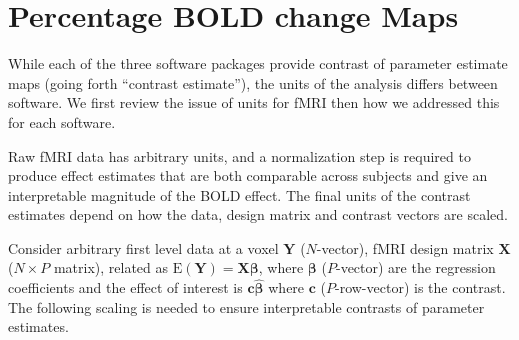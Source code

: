 %



%

\section{Percentage BOLD change Maps}
\label{App:SC_supplementary_BOLD}

While each of the three software packages provide contrast of parameter estimate maps (going forth ``contrast estimate''), the units of the analysis differs between software.  We first review the issue of units for fMRI then how we addressed this for each software.

Raw fMRI data has arbitrary units, and a normalization step is required to produce effect estimates that are both comparable across subjects and give an interpretable magnitude of the BOLD effect. The final units of the contrast estimates depend on how the data, design matrix and contrast vectors are scaled.

Consider arbitrary first level data at a voxel $\bm{Y}$ ($N$-vector), fMRI design matrix $\bm{X}$ ($N\times P$ matrix), related as $\mathrm{E}(\bm{Y})=\bm{X}\bm{\beta}$, where $\bm{\beta}$ ($P$-vector) are the regression coefficients and the effect of interest is $\bm{c}\hat{\bm{\beta}}$ where $\bm{c}$ ($P$-row-vector) is the contrast.  The following scaling is needed to ensure interpretable contrasts of parameter estimates.

